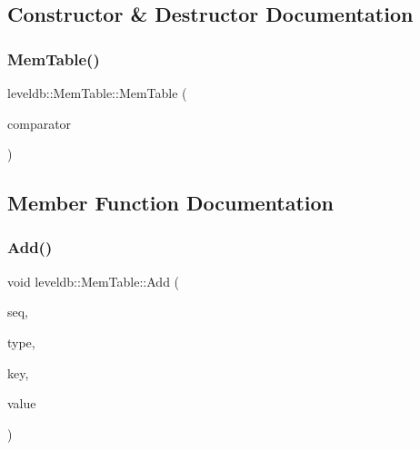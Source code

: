 \subsection{Constructor \& Destructor Documentation}
\mbox{\label{classleveldb_1_1_mem_table_a23add92a4a6e5d1521f3b6695dba5c2d}} 
\subsubsection{\texorpdfstring{MemTable()}{MemTable()}}
{\footnotesize\ttfamily leveldb\+::\+Mem\+Table\+::\+Mem\+Table (\begin{DoxyParamCaption}\item[{const \mbox{\hyperlink{classleveldb_1_1_internal_key_comparator}{Internal\+Key\+Comparator}} \&}]{comparator }\end{DoxyParamCaption})\hspace{0.3cm}{\ttfamily [explicit]}}



\subsection{Member Function Documentation}
\mbox{\label{classleveldb_1_1_mem_table_a37bec80954badb2354426aa175e9371f}} 
\subsubsection{\texorpdfstring{Add()}{Add()}}
{\footnotesize\ttfamily void leveldb\+::\+Mem\+Table\+::\+Add (\begin{DoxyParamCaption}\item[{\mbox{\hyperlink{namespaceleveldb_a5481ededd221c36d652c371249f869fa}{Sequence\+Number}}}]{seq,  }\item[{\mbox{\hyperlink{namespaceleveldb_acc038cb0d608414730cafa459a4ba866}{Value\+Type}}}]{type,  }\item[{const \mbox{\hyperlink{classleveldb_1_1_slice}{Slice}} \&}]{key,  }\item[{const \mbox{\hyperlink{classleveldb_1_1_slice}{Slice}} \&}]{value }\end{DoxyParamCaption})}

